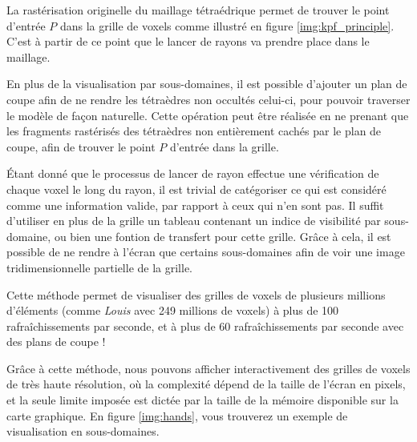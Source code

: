 {{{			La rastérisation originelle du maillage tétraédrique permet de trouver le point d'entrée $P$ dans la grille de voxels comme illustré en figure \ref{img:kpf_principle}. C'est à partir de ce point que le lancer de rayons va prendre place dans le maillage.

			En plus de la visualisation par sous-domaines, il est possible d'ajouter un plan de coupe afin de ne rendre les tétraèdres non occultés celui-ci, pour pouvoir traverser le modèle de façon naturelle. Cette opération peut être réalisée en ne prenant que les fragments rastérisés des tétraèdres non entièrement cachés par le plan de coupe, afin de trouver le point $P$ d'entrée dans la grille.
			
			Étant donné que le processus de lancer de rayon effectue une vérification de chaque voxel le long du rayon, il est trivial de catégoriser ce qui est considéré comme une information valide, par rapport à ceux qui n'en sont pas. Il suffit d'utiliser en plus de la grille un tableau contenant un indice de visibilité par sous-domaine, ou bien une fontion de transfert pour cette grille. Grâce à cela, il est possible de ne rendre à l'écran que certains sous-domaines afin de voir une image tridimensionnelle partielle de la grille.

			Cette méthode permet de visualiser des grilles de voxels de plusieurs millions d'éléments (comme \textit{Louis} avec 249 millions de voxels) à plus de 100 rafraîchissements par seconde, et à plus de 60 rafraîchissements par seconde avec des plans de coupe !

			Grâce à cette méthode, nous pouvons afficher interactivement des grilles de voxels de très haute résolution, où la complexité dépend de la taille de l'écran en pixels, et la seule limite imposée est dictée par la taille de la mémoire disponible sur la carte graphique. En figure \ref{img:hands}, vous trouverez un exemple de visualisation en sous-domaines.
			
}}}
